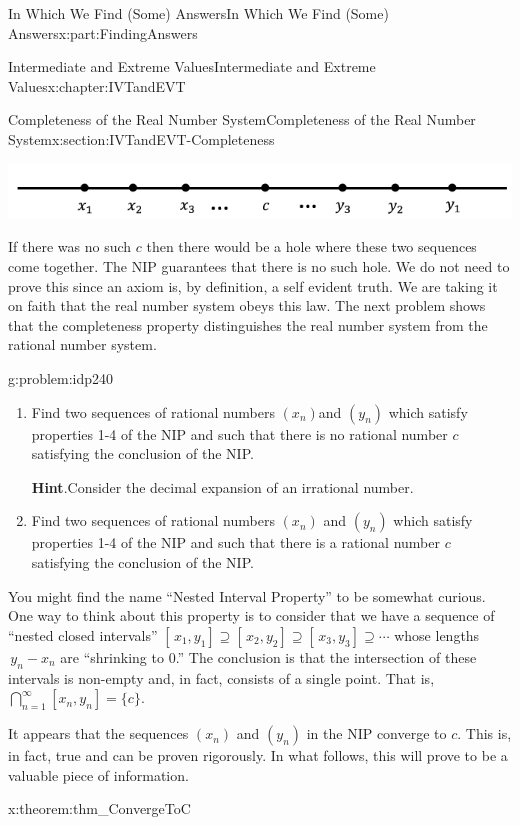 \documentclass[oneside,10pt,]{book}
\newcommand{\blocktitlefont}{\relax}
\numberwithin{equation}{section}
\begin{document}
\begin{partptx}{In Which We Find (Some) Answers}{}{In Which We Find (Some) Answers}{}{}{x:part:FindingAnswers}
\begin{chapterptx}{Intermediate and Extreme Values}{}{Intermediate and Extreme Values}{}{}{x:chapter:IVTandEVT}
\begin{sectionptx}{Completeness of the Real Number System}{}{Completeness of the Real Number System}{}{}{x:section:IVTandEVT-Completeness}
\begin{image}{0.125}{0.75}{0.125}%
\includegraphics[width=\linewidth]{images/Ch6fig4.png}
\end{image}%
If there was no such \(c\) then there would be a hole where these two sequences come together.  The NIP guarantees that there is no such hole.  We do not need to prove this since an axiom is, by definition, a self evident truth.  We are taking it on faith that the real number system obeys this law.  The next problem shows that the completeness property distinguishes the real number system from the rational number system.%
\begin{problem}{}{g:problem:idp240}%
\begin{enumerate}[font=\bfseries,label=(\alph*),ref=\alph*]
\item{}Find two sequences of rational numbers \(\left(x_n\right)\)and \(\left(y_n\right)\) which satisfy properties 1-4 of the NIP and such that there is no rational number \(c\) satisfying the conclusion of the NIP.%
\par\smallskip%
\noindent\textbf{\blocktitlefont Hint}.\hypertarget{g:hint:idp241}{}\quad{}Consider the decimal expansion of an irrational number.%
\item{}Find two sequences of rational numbers \(\left(x_n\right)\) and \(\left(y_n\right)\) which satisfy properties 1-4 of the NIP and such that there is a rational number \(c\) satisfying the conclusion of the NIP.%
\end{enumerate}
\end{problem}
You might find the name ``Nested Interval Property'' to be somewhat curious. One way to think about this property is to consider that we have a sequence of ``nested closed intervals'' \([\,x_1,y_1]\supseteq[\,x_2,y_2]\supseteq[\,x_3,y_3]\supseteq\cdots\) whose lengths \(\,y_n-x_n\) are ``shrinking to \(0\).'' The conclusion is that the intersection of these intervals is non-empty and, in fact, consists of a single point. That is, \(\bigcap_{n=1}^\infty[x_n,y_n]=\{c\}\).%
\par
It appears that the sequences \(\left(x_n\right)\) and \(\left(y_n\right)\) in the NIP converge to \(c\). This is, in fact, true and can be proven rigorously. In what follows, this will prove to be a valuable piece of information.%
\begin{theorem}{}{}{x:theorem:thm_ConvergeToC}%

\end{theorem}
\end{sectionptx}
\end{chapterptx}
\end{partptx}
\end{document}
